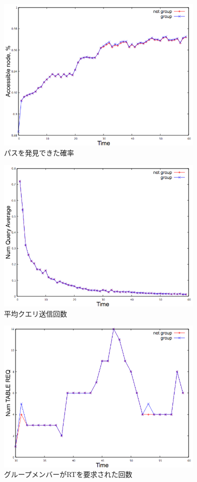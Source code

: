 \documentclass[12pt]{jarticle}
\begin{document}
\begin{figure}[h]
 \centering
   \includegraphics[width=100mm]{figures/group_accessible.png}
 \caption{パスを発見できた確率}
 \label{ex4-1}
\end{figure}

\begin{figure}[h]
 \centering
   \includegraphics[width=100mm]{figures/group_query.png}
 \caption{平均クエリ送信回数}
 \label{ex4-2}
\end{figure}

\begin{figure}[h]
 \centering
   \includegraphics[width=100mm]{figures/table_req.png}
 \caption{グループメンバーがRTを要求された回数}
 \label{ex4-3}
\end{figure}
\end{document}
